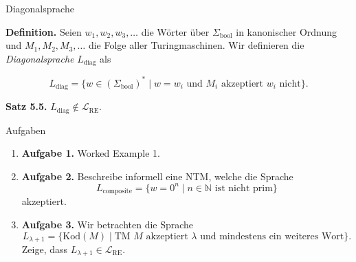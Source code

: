 \documentclass[11pt,aspectratio=169]{beamer}
\begin{document}
\begin{frame}{Diagonalsprache}

    \justifying

    \textbf{Definition.}
    Seien \(w_1, w_2, w_3, \ldots\) die Wörter über \(\Sigma_{\text{bool}}\) in kanonischer Ordnung
    und \(M_1, M_2, M_3, \ldots\) die Folge aller Turingmaschinen. Wir definieren die
    \textit{Diagonalsprache} \(L_{\text{diag}}\) als

    \[
        L_{\text{diag}} =
        \{ w \in (\Sigma_{\text{bool}})^* \mid w = w_i \text{ und } M_i \text{ akzeptiert } w_i \text{ nicht} \}.
    \]

    \vspace{1em}

    \textbf{Satz 5.5.} \(L_{\text{diag}} \not\in \mathcal L_{\text{RE}}\).
\end{frame}


\begin{frame}{Aufgaben}
    \begin{enumerate}
        \justifying
        \item 
            \textbf{Aufgabe 1.}
            Worked Example 1.
        \item
            \textbf{Aufgabe 2.}
            Beschreibe informell eine NTM, welche die Sprache
            \[
                L_{\text{composite}} = \{ w = 0^n \mid n \in \mathbb N \text{ ist nicht prim}\}
            \]
            akzeptiert.
        \item
            \textbf{Aufgabe 3.}
            Wir betrachten die Sprache
            \[
                L_{\lambda + 1} = \{\text{Kod}(M) \mid \text{TM } M \text{ akzeptiert } \lambda \text{ und mindestens ein weiteres Wort}\}.
            \]
            Zeige, dass \(L_{\lambda + 1} \in \mathcal L_{\text{RE}}\).
    \end{enumerate}
\end{frame}
\end{document}
